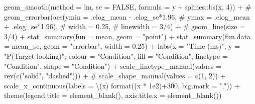 \documentclass[
  letterpaper,
  DIV=11,
  numbers=noendperiod]{scrartcl}
\newenvironment{Shaded}{\begin{snugshade}}{\end{snugshade}}
\newcommand{\AttributeTok}[1]{\textcolor[rgb]{0.40,0.45,0.13}{#1}}
\newcommand{\CommentTok}[1]{\textcolor[rgb]{0.37,0.37,0.37}{#1}}
\newcommand{\ConstantTok}[1]{\textcolor[rgb]{0.56,0.35,0.01}{#1}}
\newcommand{\DecValTok}[1]{\textcolor[rgb]{0.68,0.00,0.00}{#1}}
\newcommand{\FloatTok}[1]{\textcolor[rgb]{0.68,0.00,0.00}{#1}}
\newcommand{\FunctionTok}[1]{\textcolor[rgb]{0.28,0.35,0.67}{#1}}
\newcommand{\NormalTok}[1]{\textcolor[rgb]{0.00,0.23,0.31}{#1}}
\newcommand{\SpecialCharTok}[1]{\textcolor[rgb]{0.37,0.37,0.37}{#1}}
\newcommand{\StringTok}[1]{\textcolor[rgb]{0.13,0.47,0.30}{#1}}
\begin{document}
\begin{Shaded}
\begin{Highlighting}[]
    \FunctionTok{geom\_smooth}\NormalTok{(}\AttributeTok{method =}\NormalTok{ lm, }
                \AttributeTok{se =} \ConstantTok{FALSE}\NormalTok{, }
                \AttributeTok{formula =}\NormalTok{ y }\SpecialCharTok{\textasciitilde{}}\NormalTok{ splines}\SpecialCharTok{::}\FunctionTok{bs}\NormalTok{(x, }\DecValTok{4}\NormalTok{)) }\SpecialCharTok{+}
    \CommentTok{\# geom\_errorbar(aes(ymin = .elog\_mean {-} .elog\_se*1.96, }
    \CommentTok{\#                 ymax = .elog\_mean + .elog\_se*1.96),}
    \CommentTok{\#             width = 0.25,}
    \CommentTok{\#             linewidth = 3/4) + }
    \CommentTok{\# geom\_line(size = 3/4) + }
    \FunctionTok{stat\_summary}\NormalTok{(}\AttributeTok{fun =}\NormalTok{ mean, }\AttributeTok{geom =} \StringTok{"point"}\NormalTok{) }\SpecialCharTok{+}
    \FunctionTok{stat\_summary}\NormalTok{(}\AttributeTok{fun.data =}\NormalTok{ mean\_se,}
                 \AttributeTok{geom =} \StringTok{"errorbar"}\NormalTok{,}
                 \AttributeTok{width =} \FloatTok{0.25}\NormalTok{) }\SpecialCharTok{+}
    \FunctionTok{labs}\NormalTok{(}\AttributeTok{x =} \StringTok{"Time (ms)"}\NormalTok{,}
         \AttributeTok{y =} \StringTok{"P(Target looking)"}\NormalTok{,}
         \AttributeTok{colour =} \StringTok{"Condition"}\NormalTok{,}
         \AttributeTok{fill =} \StringTok{"Condition"}\NormalTok{,}
         \AttributeTok{linetype =} \StringTok{"Condition"}\NormalTok{,}
         \AttributeTok{shape =} \StringTok{"Condition"}\NormalTok{) }\SpecialCharTok{+}
    \FunctionTok{scale\_linetype\_manual}\NormalTok{(}\AttributeTok{values =} \FunctionTok{rev}\NormalTok{(}\FunctionTok{c}\NormalTok{(}\StringTok{"solid"}\NormalTok{, }\StringTok{"dashed"}\NormalTok{))) }\SpecialCharTok{+}
    \CommentTok{\# scale\_shape\_manual(values = c(1, 2)) +}
    \FunctionTok{scale\_x\_continuous}\NormalTok{(}\AttributeTok{labels =}\NormalTok{ \textbackslash{}(x) }\FunctionTok{format}\NormalTok{((x }\SpecialCharTok{*} \FloatTok{1e2}\NormalTok{)}\SpecialCharTok{+}\DecValTok{300}\NormalTok{, }
                                            \AttributeTok{big.mark =} \StringTok{","}\NormalTok{)) }\SpecialCharTok{+}
    \FunctionTok{theme}\NormalTok{(}\AttributeTok{legend.title =} \FunctionTok{element\_blank}\NormalTok{(),}
          \AttributeTok{axis.title.x =} \FunctionTok{element\_blank}\NormalTok{()) }
\end{Highlighting}
\end{Shaded}
\end{document}
